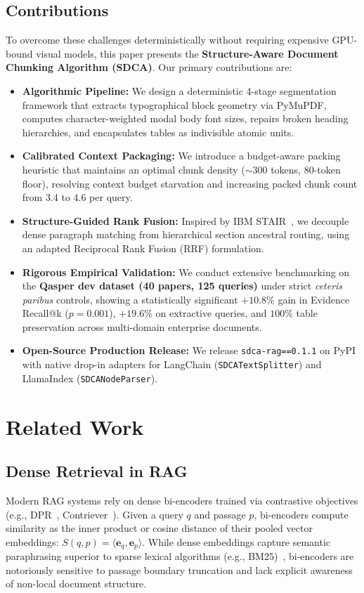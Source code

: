 \documentclass[conference]{IEEEtran}
\begin{document}
\subsection{Contributions}
To overcome these challenges deterministically without requiring expensive GPU-bound visual models, this paper presents the \textbf{Structure-Aware Document Chunking Algorithm (SDCA)}. Our primary contributions are:
\begin{itemize}
    \item \textbf{Algorithmic Pipeline:} We design a deterministic 4-stage segmentation framework that extracts typographical block geometry via PyMuPDF, computes character-weighted modal body font sizes, repairs broken heading hierarchies, and encapsulates tables as indivisible atomic units.
    \item \textbf{Calibrated Context Packaging:} We introduce a budget-aware packing heuristic that maintains an optimal chunk density ($\sim$300 tokens, 80-token floor), resolving context budget starvation and increasing packed chunk count from 3.4 to 4.6 per query.
    \item \textbf{Structure-Guided Rank Fusion:} Inspired by IBM STAIR~\cite{ibm2024stair}, we decouple dense paragraph matching from hierarchical section ancestral routing, using an adapted Reciprocal Rank Fusion (RRF) formulation.
    \item \textbf{Rigorous Empirical Validation:} We conduct extensive benchmarking on the \textbf{Qasper dev dataset (40 papers, 125 queries)} under strict \textit{ceteris paribus} controls, showing a statistically significant $+10.8\%$ gain in Evidence Recall@k ($p=0.001$), $+19.6\%$ on extractive queries, and $100\%$ table preservation across multi-domain enterprise documents.
    \item \textbf{Open-Source Production Release:} We release \texttt{sdca-rag==0.1.1} on PyPI with native drop-in adapters for LangChain (\texttt{SDCATextSplitter}) and LlamaIndex (\texttt{SDCANodeParser}).
\end{itemize}

\section{Related Work}

\subsection{Dense Retrieval in RAG}
Modern RAG systems rely on dense bi-encoders trained via contrastive objectives (e.g., DPR~\cite{karpukhin2020dpr}, Contriever~\cite{izacard2022contriever}). Given a query $q$ and passage $p$, bi-encoders compute similarity as the inner product or cosine distance of their pooled vector embeddings: $S(q, p) = \langle \mathbf{e}_q, \mathbf{e}_p \rangle$. While dense embeddings capture semantic paraphrasing superior to sparse lexical algorithms (e.g., BM25)~\cite{robertson2009bm25}, bi-encoders are notoriously sensitive to passage boundary truncation and lack explicit awareness of non-local document structure.
\end{document}
